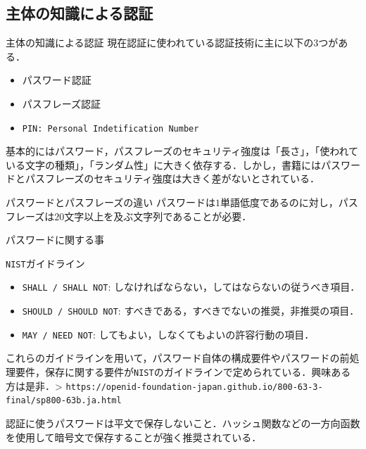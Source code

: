 \documentclass[11pt, aspectratio=169]{beamer}
\begin{document}
\subsection{主体の知識による認証}

\begin{frame}{主体の知識による認証}
  現在認証に使われている認証技術に主に以下の$3$つがある．
  \begin{itemize}
    \item パスワード認証
    \item パスフレーズ認証
    \item \texttt{PIN: Personal Indetification Number}
  \end{itemize}
  基本的にはパスワード，パスフレーズのセキュリティ強度は「長さ」，「使われている文字の種類」，「ランダム性」に大きく依存する．しかし，書籍にはパスワードとパスフレーズのセキュリティ強度は大きく差がないとされている．
  \begin{alertblock}{パスワードとパスフレーズの違い}
    パスワードは$1$単語低度であるのに対し，パスフレーズは$20$文字以上を及ぶ文字列であることが必要．
  \end{alertblock}
\end{frame}

\begin{frame}{パスワードに関する事}
  \begin{block}{\texttt{NIST}ガイドライン}
    \begin{itemize}
      \item \texttt{SHALL / SHALL NOT}: しなければならない，してはならないの従うべき項目．
      \item \texttt{SHOULD / SHOULD NOT}: すべきである，すべきでないの推奨，非推奨の項目．
      \item \texttt{MAY / NEED NOT}: してもよい，しなくてもよいの許容行動の項目．
    \end{itemize}
  \end{block}
  これらのガイドラインを用いて，パスワード自体の構成要件やパスワードの前処理要件，保存に関する要件が\texttt{NIST}のガイドラインで定められている．興味ある方は是非．> \texttt{https://openid-foundation-japan.github.io/800-63-3-final/sp800-63b.ja.html}
  
  \vspace{1em}

  認証に使うパスワードは平文で保存しないこと．ハッシュ関数などの一方向函数を使用して暗号文で保存することが強く推奨されている．
\end{frame}
\end{document}
